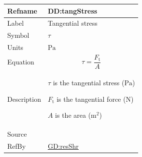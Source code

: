 \documentclass[12pt]{article}
\begin{document}
\medskip
\noindent
\begin{minipage}{\textwidth}
\begin{tabular}{>{\raggedright}p{}>{\raggedright\arraybackslash}p{}}
\toprule \textbf{Refname} & \textbf{DD:tangStress}
\label{DD:tangStress}
\\ \midrule
Label & Tangential stress
        
\\ \midrule
Symbol & $τ$
         
\\ \midrule
Units & ${\text{Pa}}$
        
\\ \midrule
Equation & \begin{displaymath}
           τ=\frac{{F_{\text{t}}}}{A}
           \end{displaymath}
\\ \midrule
Description & \begin{symbDescription}
              \item{$τ$ is the tangential stress (${\text{Pa}}$)}
              \item{${F_{\text{t}}}$ is the tangential force (${\text{N}}$)}
              \item{$A$ is the area (${\text{m}^{2}}$)}
              \end{symbDescription}
\\ \midrule
Source & \cite{huston2008}
         
\\ \midrule
RefBy & \hyperref[GD:resShr]{GD:resShr}
        
\\ \bottomrule
\end{tabular}
\end{minipage}
\end{document}
